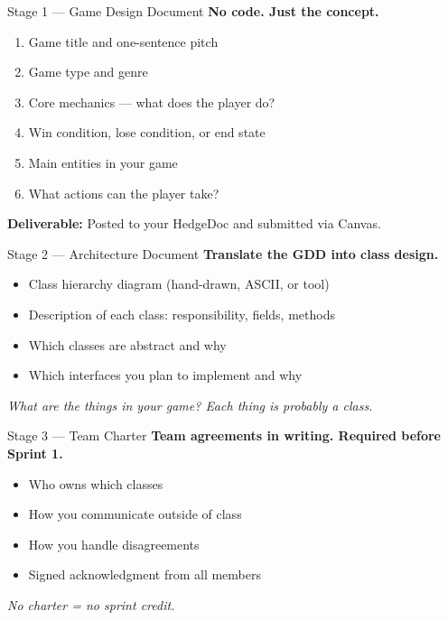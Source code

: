 \documentclass{beamer}
\begin{document}
\begin{frame}{Stage 1 --- Game Design Document}
\textbf{No code. Just the concept.}
\vspace{0.2cm}
\begin{enumerate}
  \item Game title and one-sentence pitch
  \item Game type and genre
  \item Core mechanics --- what does the player do?
  \item Win condition, lose condition, or end state
  \item Main entities in your game
  \item What actions can the player take?
\end{enumerate}
\vspace{0.3cm}
\textbf{Deliverable:} Posted to your HedgeDoc and submitted via Canvas.
\end{frame}
\begin{frame}{Stage 2 --- Architecture Document}
\textbf{Translate the GDD into class design.}
\vspace{0.2cm}
\begin{itemize}
  \item Class hierarchy diagram (hand-drawn, ASCII, or tool)
  \item Description of each class: responsibility, fields, methods
  \item Which classes are abstract and why
  \item Which interfaces you plan to implement and why
\end{itemize}
\vspace{0.3cm}
\textit{What are the things in your game? Each thing is probably a class.}
\end{frame}
\begin{frame}{Stage 3 --- Team Charter}
\textbf{Team agreements in writing. Required before Sprint 1.}
\vspace{0.2cm}
\begin{itemize}
  \item Who owns which classes
  \item How you communicate outside of class
  \item How you handle disagreements
  \item Signed acknowledgment from all members
\end{itemize}
\vspace{0.3cm}
\textit{No charter = no sprint credit.}
\end{frame}
\end{document}
